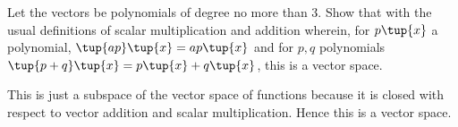 \begin{enumialphparenastyle}
\begin{ex} Let the vectors be polynomials of degree no more than 3. Show that
with the usual definitions of scalar multiplication and addition wherein,
for $p\tup{x} $ a polynomial, $\tup{a p} \tup{
x} = a p\tup{x} $ and for $p,q$ polynomials $\tup{
p+q} \tup{x} =  p\tup{x} +q\tup{x}$, this
is a vector space.
\begin{sol}
This is just a subspace of the vector space of functions
because it is closed with respect to vector addition and scalar
multiplication. Hence this is a vector space.
\end{sol}
\end{ex}

\end{enumialphparenastyle}
